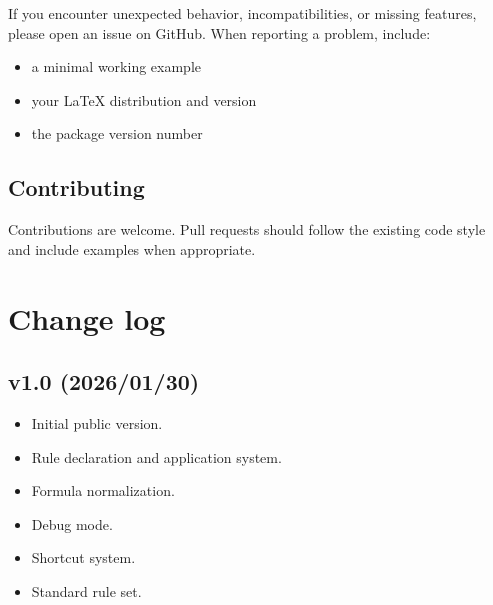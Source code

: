 \documentclass[a4paper,1pt]{article}
\begin{document}
If you encounter unexpected behavior, incompatibilities, or missing
features, please open an issue on GitHub. When reporting a problem,
include:

\begin{itemize}
    \item a minimal working example
    \item your \LaTeX{} distribution and version
    \item the package version number
\end{itemize}

\subsection*{Contributing}

Contributions are welcome. Pull requests should follow the existing code
style and include examples when appropriate.

\section{Change log}

\subsection*{v1.0 (2026/01/30)}

\begin{itemize}
    \item Initial public version.
    \item Rule declaration and application system.
    \item Formula normalization.
    \item Debug mode.
    \item Shortcut system.
    \item Standard rule set.
\end{itemize}
\end{document}
